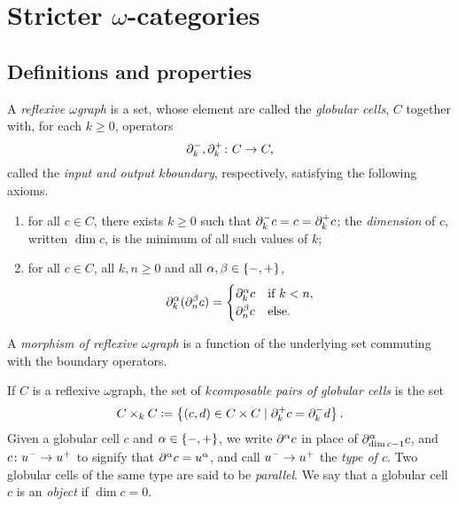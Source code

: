 \section{Stricter \texorpdfstring{$\omega$}{ω}-categories}

\subsection{Definitions and properties}

\begin{dfn} 
    A \emph{reflexive \( \omega \)\nbd graph} is a set, whose element are called the \emph{globular cells}, \( C \) together with, for each \( k \geq 0 \), operators
    \begin{equation*}
        \partial_{k}^{-}, \partial_{k}^{+} \colon C \to C,
    \end{equation*}
    called the \emph{input and output \( k \)\nbd boundary}, respectively, satisfying the following axioms.
    \begin{enumerate}
        \item for all \( c \in C \), there exists \( k \geq 0 \) such that \( \partial_{k}^{-} c = c = \partial_{k}^{+} c \); the \emph{dimension} of \( c \), written \( \dim c \), is the minimum of all such values of \( k \);
        \item for all \( c \in C \), all \( k, n \geq 0 \) and all \( \alpha, \beta \in \left\{ {-, +} \right\} \),
        \begin{equation*}
            \partial_{k}^{\alpha}(\partial_{n}^{\beta} c) = 
            \begin{cases}
                \partial_{k}^{\alpha} c & \text{if }k < n, \\
                \partial_{n}^{\beta} c& \text{else.}
            \end{cases}
        \end{equation*}
    \end{enumerate}
    A \emph{morphism of reflexive \( \omega \)\nbd graph} is a function of the underlying set commuting with the boundary operators.
\end{dfn}

\noindent If \( C \) is a reflexive \( \omega \)\nbd graph, the set of \emph{\( k \)\nbd composable pairs of globular cells} is the set 
\begin{equation*}
    C \times_k C \coloneqq \left\{ {(c, d) \in C \times C \mid \partial_{k}^{+} c = \partial_{k}^{-} d} \right\}.
\end{equation*}
Given a globular cell \( c \) and \( \alpha \in \left\{ {-, +} \right\} \), we write \( \partial_{}^{\alpha} c \) in place of \( \partial_{\dim c - 1}^{\alpha} c \), and \( c \colon u^- \to u^+ \) to signify that \( \partial_{}^{\alpha} c = u^\alpha \), and call \( u^- \to u^+ \) the \emph{type of \( c \)}. 
Two globular cells of the same type are said to be \emph{parallel}.
We say that a globular cell \( c \) is an \emph{object} if \( \dim c = 0 \). 

